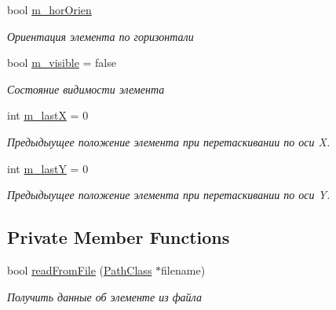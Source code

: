 \begin{DoxyCompactItemize}
bool \hyperlink{class_interface_element_class_a029cdb3ead496730b2aac67d0f22ba34}{m\+\_\+hor\+Orien}
\begin{DoxyCompactList}\small\item\em Ориентация элемента по горизонтали \end{DoxyCompactList}\item 
bool \hyperlink{class_interface_element_class_a734e2f12d7ca918619dda46ac2c4e56e}{m\+\_\+visible} = false
\begin{DoxyCompactList}\small\item\em Состояние видимости элемента \end{DoxyCompactList}\item 
int \hyperlink{class_interface_element_class_aa543f71120067c5cb3f4208a6e0fe3aa}{m\+\_\+lastX} = 0
\begin{DoxyCompactList}\small\item\em Предыдыущее положение элемента при перетаскивании по оси X. \end{DoxyCompactList}\item 
int \hyperlink{class_interface_element_class_abbd9a7e0ff18d4bb41d01aad1653f167}{m\+\_\+lastY} = 0
\begin{DoxyCompactList}\small\item\em Предыдыущее положение элемента при перетаскивании по оси Y. \end{DoxyCompactList}\end{DoxyCompactItemize}
\subsection*{Private Member Functions}
\begin{DoxyCompactItemize}
\item 
bool \hyperlink{class_slider_element_class_a68082cc20a1c0940aa5057e5ece89a60}{read\+From\+File} (\hyperlink{class_path_class}{Path\+Class} $\ast$filename)
\begin{DoxyCompactList}\small\item\em Получить данные об элементе из файла \end{DoxyCompactList}\end{DoxyCompactItemize}
